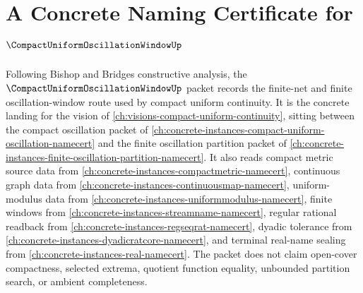 \chapter{A Concrete Naming Certificate for $\CompactUniformOscillationWindowUp$}
\label{ch:concrete-instances-compact-uniform-oscillation-window-namecert}

Following Bishop and Bridges constructive analysis, the $\CompactUniformOscillationWindowUp$ packet records the finite-net and finite oscillation-window route used by compact uniform continuity. It is the concrete landing for the vision of \autoref{ch:visions-compact-uniform-continuity}, sitting between the compact oscillation packet of \autoref{ch:concrete-instances-compact-uniform-oscillation-namecert} and the finite oscillation partition packet of \autoref{ch:concrete-instances-finite-oscillation-partition-namecert}. It also reads compact metric source data from \autoref{ch:concrete-instances-compactmetric-namecert}, continuous graph data from \autoref{ch:concrete-instances-continuousmap-namecert}, uniform-modulus data from \autoref{ch:concrete-instances-uniformmodulus-namecert}, finite windows from \autoref{ch:concrete-instances-streamname-namecert}, regular rational readback from \autoref{ch:concrete-instances-regseqrat-namecert}, dyadic tolerance from \autoref{ch:concrete-instances-dyadicratcore-namecert}, and terminal real-name sealing from \autoref{ch:concrete-instances-real-namecert}. The packet does not claim open-cover compactness, selected extrema, quotient function equality, unbounded partition search, or ambient completeness.


